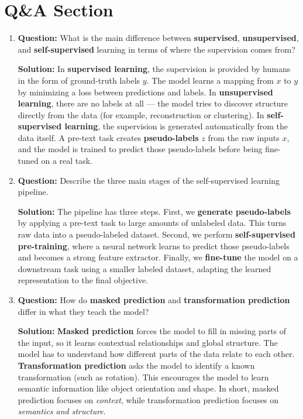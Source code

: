 \documentclass{article}
\begin{document}
\section{Q\&A Section}

\begin{enumerate}

\item \textbf{Question:} 
What is the main difference between \textbf{supervised}, \textbf{unsupervised}, and \textbf{self-supervised} learning in terms of where the supervision comes from?

\textbf{Solution:}  
In \textbf{supervised learning}, the supervision is provided by humans in the form of ground-truth labels $y$. The model learns a mapping from $x$ to $y$ by minimizing a loss between predictions and labels.  
In \textbf{unsupervised learning}, there are no labels at all — the model tries to discover structure directly from the data (for example, reconstruction or clustering).  
In \textbf{self-supervised learning}, the supervision is generated automatically from the data itself. A pre-text task creates \textbf{pseudo-labels} $z$ from the raw inputs $x$, and the model is trained to predict those pseudo-labels before being fine-tuned on a real task.

\item \textbf{Question:} 
Describe the three main stages of the self-supervised learning pipeline.

\textbf{Solution:}  
The pipeline has three steps.  
First, we \textbf{generate pseudo-labels} by applying a pre-text task to large amounts of unlabeled data. This turns raw data into a pseudo-labeled dataset.  
Second, we perform \textbf{self-supervised pre-training}, where a neural network learns to predict those pseudo-labels and becomes a strong feature extractor.  
Finally, we \textbf{fine-tune} the model on a downstream task using a smaller labeled dataset, adapting the learned representation to the final objective.

\item \textbf{Question:} 
How do \textbf{masked prediction} and \textbf{transformation prediction} differ in what they teach the model?

\textbf{Solution:}  
\textbf{Masked prediction} forces the model to fill in missing parts of the input, so it learns contextual relationships and global structure. The model has to understand how different parts of the data relate to each other.  
\textbf{Transformation prediction} asks the model to identify a known transformation (such as rotation). This encourages the model to learn semantic information like object orientation and shape.  
In short, masked prediction focuses on \emph{context}, while transformation prediction focuses on \emph{semantics and structure}.


\end{enumerate}
\end{document}
